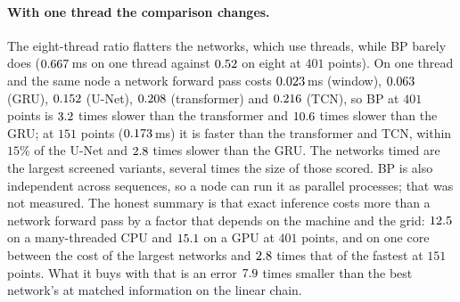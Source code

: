 \paragraph{With one thread the comparison changes.}
The eight-thread ratio flatters the networks, which use threads, while BP barely does ($0.667$\,ms on
one thread against $0.52$ on eight at $401$ points). On one thread and the same node a network
forward pass costs $0.023$\,ms (window), $0.063$ (GRU), $0.152$ (U-Net), $0.208$
(transformer) and $0.216$ (TCN), so BP at $401$ points is $3.2$ times slower than the transformer and
$10.6$ times slower than the GRU; at $151$ points ($0.173$\,ms) it is faster than the transformer and
TCN, within $15\%$ of the U-Net and $2.8$ times slower than the GRU. The networks timed are the
largest screened variants, several times the size of those scored. BP is also independent across sequences, so a
node can run it as parallel processes; that was not measured. The honest summary is that exact inference costs more than a network
forward pass by a factor that depends on the machine and the grid: $12.5$ on a many-threaded CPU and
$15.1$ on a GPU at $401$ points, and on one core between the cost of the largest networks and
$2.8$ times that of the fastest at $151$ points. What it buys with that is an error
$7.9$ times smaller than the best network's at matched information on the linear chain.

